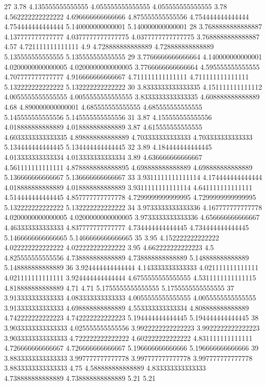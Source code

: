 27 3.78 4.135555555555555 4.055555555555555 4.055555555555555 3.78 4.562222222222222 4.696666666666666 4.875555555555556 4.754444444444444 4.754444444444444 5.140000000000001 5.140000000000001
28 3.7688888888888887 4.137777777777777 4.0377777777777775 4.0377777777777775 3.7688888888888887 4.57 4.721111111111111 4.9 4.728888888888889 4.728888888888889 5.135555555555555 5.135555555555555
29 3.7766666666666664 4.140000000000001 4.0200000000000005 4.0200000000000005 3.7766666666666664 4.595555555555555 4.707777777777777 4.916666666666667 4.711111111111111 4.711111111111111 5.132222222222222 5.132222222222222
30 3.8333333333333335 4.151111111111112 4.0055555555555555 4.0055555555555555 3.8333333333333335 4.608888888888889 4.68 4.890000000000001 4.685555555555555 4.685555555555555 5.145555555555556 5.145555555555556
31 3.87 4.155555555555556 4.018888888888889 4.018888888888889 3.87 4.615555555555555 4.6033333333333335 4.898888888888889 4.703333333333333 4.703333333333333 5.134444444444445 5.134444444444445
32 3.89 4.184444444444445 4.013333333333334 4.013333333333334 3.89 4.636666666666667 4.561111111111111 4.8788888888888895 4.698888888888889 4.698888888888889 5.136666666666667 5.136666666666667
33 3.9311111111111114 4.174444444444444 4.018888888888889 4.018888888888889 3.9311111111111114 4.641111111111111 4.514444444444445 4.857777777777778 4.7299999999999995 4.7299999999999995 5.132222222222222 5.132222222222222
34 3.9733333333333336 4.167777777777778 4.0200000000000005 4.0200000000000005 3.9733333333333336 4.656666666666667 4.463333333333333 4.837777777777777 4.734444444444445 4.734444444444445 5.1466666666666665 5.1466666666666665
35 3.95 4.152222222222222 4.022222222222222 4.022222222222222 3.95 4.662222222222223 4.5 4.825555555555556 4.738888888888889 4.738888888888889 5.148888888888889 5.148888888888889
36 3.924444444444444 4.143333333333333 4.021111111111111 4.021111111111111 3.924444444444444 4.6755555555555555 4.5311111111111115 4.818888888888889 4.71 4.71 5.1755555555555555 5.1755555555555555
37 3.913333333333333 4.083333333333333 4.0055555555555555 4.0055555555555555 3.913333333333333 4.698888888888889 4.553333333333334 4.808888888888889 4.742222222222223 4.742222222222223 5.194444444444445 5.194444444444445
38 3.9033333333333333 4.025555555555556 3.9922222222222223 3.9922222222222223 3.9033333333333333 4.722222222222222 4.602222222222222 4.831111111111111 4.726666666666667 4.726666666666667 5.196666666666666 5.196666666666666
39 3.8833333333333333 3.997777777777778 3.997777777777778 3.997777777777778 3.8833333333333333 4.75 4.588888888888889 4.833333333333333 4.738888888888889 4.738888888888889 5.21 5.21
